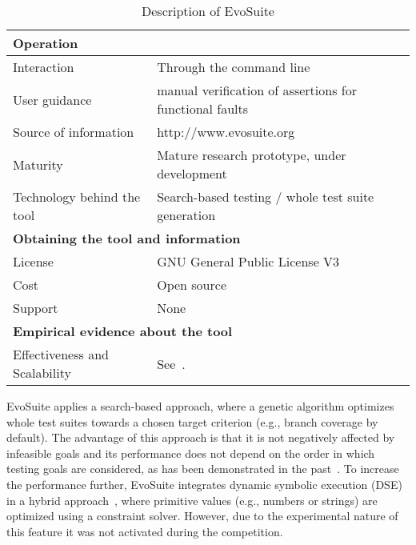 \documentclass[runningheads,a4paper]{llncs}
\newcommand{\EVOSUITE}{{\sc EvoSuite}\xspace}
\begin{document}
\begin{table}[t]
\begin{tabular}{|l|p{5cm}|}
      \hline
      \multicolumn{2}{|l|}{{\bf Operation}} \\
      \hline
  Interaction &  Through the command line\\
  User guidance &  manual verification of assertions for functional faults\\
  Source of information &  http://www.evosuite.org \\
  Maturity&  Mature research prototype, under development\\
  Technology behind the tool & Search-based testing / whole test suite generation\\
    \hline
      \multicolumn{2}{|l|}{{\bf Obtaining the tool and information}} \\
      \hline
License & GNU General Public License V3\\
Cost & Open source\\
Support & None \\
    \hline
    \hline
      \multicolumn{2}{|l|}{{\bf Empirical evidence about the tool}} \\
      \hline
  Effectiveness and Scalability & See~\cite{GoA_TSE12,FrA12b}. \\
    \hline
    \end{tabular}
%
\vspace{0.4cm}
	\caption{Description of \EVOSUITE}\label{tool-description}
\end{table}


\EVOSUITE applies a search-based approach, where a genetic algorithm
optimizes whole test suites towards a chosen target criterion (e.g.,
branch coverage by default). The advantage of this approach is that it
is not negatively affected by infeasible goals and its performance
does not depend on the order in which testing goals are considered, as
has been demonstrated in the past~\cite{GoA_TSE12}. To increase the
performance further, \EVOSUITE integrates dynamic symbolic execution
(DSE) in a hybrid approach~\cite{evoISSRE113}, where primitive values
(e.g., numbers or strings) are optimized using a constraint
solver. However, due to the experimental nature of this feature it was
not activated during the competition.
\end{document}
